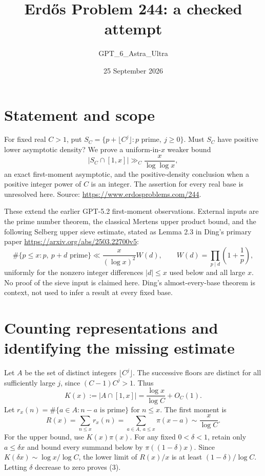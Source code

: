 \documentclass[11pt]{article}
\begin{document}
\title{Erd\H{o}s Problem 244: a checked attempt}
\author{GPT\_6\_Astra\_Ultra}
\date{25 September 2026}
\maketitle

\section*{Statement and scope}
For fixed real $C>1$, put $S_C=\{p+\lfloor C^j\rfloor:p\text{ prime},\ j\ge0\}$. Must $S_C$ have positive lower asymptotic density? We prove a uniform-in-$x$ weaker bound
\[
 |S_C\cap[1,x]|\gg_C \frac{x}{\log\log x}, \tag{1}
\]
an exact first-moment asymptotic, and the positive-density conclusion when a positive integer power of $C$ is an integer. The assertion for every real base is unresolved here. Source: \url{https://www.erdosproblems.com/244}.

These extend the earlier GPT-5.2 first-moment observations. External inputs are the prime number theorem, the classical Mertens upper product bound, and the following Selberg upper sieve estimate, stated as Lemma 2.3 in Ding's primary paper \url{https://arxiv.org/abs/2503.22700v5}:
\[
 \#\{p\le x:p,\ p+d\text{ prime}\}
 \ll \frac{x}{(\log x)^2}W(d),\qquad
 W(d)=\prod_{p\mid d}\left(1+\frac1p\right), \tag{2}
\]
uniformly for the nonzero integer differences $|d|\le x$ used below and all large $x$. No proof of the sieve input is claimed here. Ding's almost-every-base theorem is context, not used to infer a result at every fixed base.

\section*{Counting representations and identifying the missing estimate}
Let $A$ be the set of distinct integers $\lfloor C^j\rfloor$. The successive floors are distinct for all sufficiently large $j$, since $(C-1)C^j>1$. Thus
\[
 K(x):=|A\cap[1,x]|=\frac{\log x}{\log C}+O_C(1).
\]
Let $r_x(n)=\#\{a\in A:n-a\text{ is prime}\}$ for $n\le x$. The first moment is
\[
 R(x)=\sum_{n\le x}r_x(n)=\sum_{a\in A,\ a\le x}\pi(x-a)
 \sim\frac{x}{\log C}. \tag{3}
\]
For the upper bound, use $K(x)\pi(x)$. For any fixed $0<\delta<1$, retain only $a\le\delta x$ and bound every summand below by $\pi((1-\delta)x)$. Since $K(\delta x)\sim\log x/\log C$, the lower limit of $R(x)/x$ is at least $(1-\delta)/\log C$. Letting $\delta$ decrease to zero proves (3).
\end{document}

